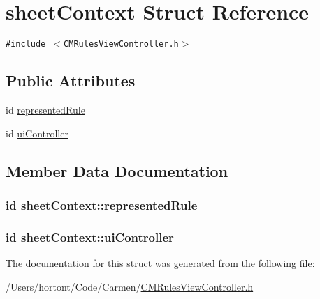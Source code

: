 \hypertarget{structsheet_context}{
\section{sheetContext Struct Reference}
\label{structsheet_context}
}
{\tt \#include $<$CMRulesViewController.h$>$}

\subsection*{Public Attributes}
\begin{CompactItemize}
\item 
id \hyperlink{structsheet_context_03eba143b20d02eadb0f55c3f14bb438}{representedRule}
\item 
id \hyperlink{structsheet_context_6d25cceb6af7f574da086ea60f832cfc}{uiController}
\end{CompactItemize}


\subsection{Member Data Documentation}
\hypertarget{structsheet_context_03eba143b20d02eadb0f55c3f14bb438}{
\subsubsection[representedRule]{\setlength{\rightskip}{0pt plus 5cm}id {\bf sheetContext::representedRule}}}
\label{structsheet_context_03eba143b20d02eadb0f55c3f14bb438}


\hypertarget{structsheet_context_6d25cceb6af7f574da086ea60f832cfc}{
\subsubsection[uiController]{\setlength{\rightskip}{0pt plus 5cm}id {\bf sheetContext::uiController}}}
\label{structsheet_context_6d25cceb6af7f574da086ea60f832cfc}




The documentation for this struct was generated from the following file:\begin{CompactItemize}
\item 
/Users/hortont/Code/Carmen/\hyperlink{_c_m_rules_view_controller_8h}{CMRulesViewController.h}\end{CompactItemize}
